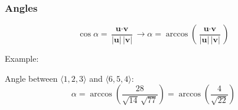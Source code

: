 \begin{frame}
 \frametitle{Angles}

$$\cos{\alpha} = \frac{\textbf{u} \cdot \textbf{v}}{|\textbf{u}|\, |\textbf{v}|} \to \alpha =
\arccos{\left( \frac{\textbf{u} \cdot \textbf{v}}{|\textbf{u}|\, |\textbf{v}|} \right)}$$

Example:

\bigskip

Angle between $\langle 1,2,3\rangle$ and $\langle 6,5,4\rangle$:
%
$$\alpha = \arccos{\left( \frac{28}{\sqrt{14}\, \sqrt{77}} \right)} =
\arccos{\left( \frac{4}{\sqrt{22}} \right)}$$

\end{frame}
